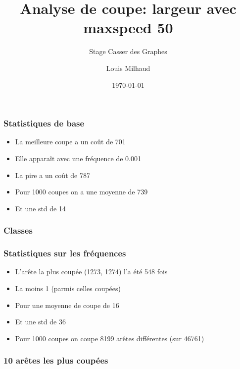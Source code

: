 \documentclass[aspectratio=169]{beamer}
\title{Analyse de coupe: largeur avec maxspeed 50}
\subtitle{Stage Casser des Graphes}
\author{Louis Milhaud}
\institute{Complex Networks - LIP6}
\date{\today}
\begin{document}
    \begin{frame}
        \titlepage
    \end{frame}

    \begin{frame}
        \frametitle{Statistiques de base}
        
        \begin{itemize}
            \item La meilleure coupe a un coût de 701
            \item Elle apparaît avec une fréquence de 0.001
            \item La pire a un coût de 787
            \item Pour 1000 coupes on a une moyenne de 739
            \item Et une std de 14
        \end{itemize}
    
    \end{frame}

    \begin{frame}
        \frametitle{Classes}
    
        
    
    \end{frame}

    \begin{frame}
        \frametitle{Statistiques sur les fréquences}
        
        \begin{itemize}
            \item L'arête la plus coupée (1273, 1274) l'a été 548 fois
            \item La moins 1 (parmis celles coupées)
            \item Pour une moyenne de coupe de 16
            \item Et une std de 36
            \item Pour 1000 coupes on coupe 8199 arêtes différentes (sur 46761)
        \end{itemize}
    
    \end{frame}

    \begin{frame}
        \frametitle{10 arêtes les plus coupées}
    
        
    
    \end{frame}
\end{document}
